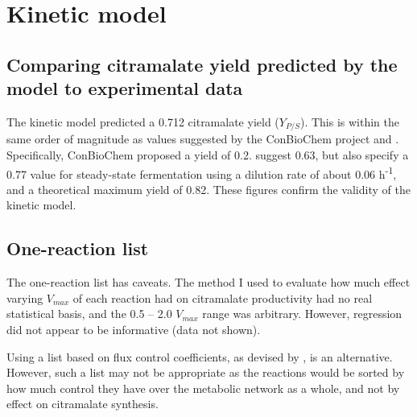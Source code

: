 \documentclass[parskip=full, numbers=noenddot]{scrreprt}
\begin{document}

\section{Kinetic model}
\label{sec:discussion-kinetic}


\subsection{Comparing citramalate yield predicted by the model to experimental data}
\label{ssec:discussion-kinetic-experimental}

The kinetic model predicted a 0.712 citramalate yield ($Y_{P/S}$). This is within the same order of magnitude as values suggested by the ConBioChem project and \citet{wu_production_2016}. Specifically, ConBioChem proposed a yield of 0.2. \citet{wu_production_2016} suggest 0.63, but also specify a 0.77 value for steady-state fermentation using a dilution rate of about 0.06 h\textsuperscript{-1}, and a theoretical maximum yield of 0.82. These figures confirm the validity of the kinetic model.

\subsection{One-reaction list}
\label{ssec:discussion-kinetic-onereaction}

The one-reaction list has caveats. The method I used to evaluate how much effect varying $V_{max}$ of each reaction had on citramalate productivity had no real statistical basis, and the 0.5 -- 2.0 $V_{max}$ range was arbitrary. However, regression did not appear to be informative (data not shown).

Using a list based on flux control coefficients, as devised by \citet{millard_metabolic_2017}, is an alternative. However, such a list may not be appropriate as the reactions would be sorted by how much control they have over the metabolic network as a whole, and not by effect on citramalate synthesis.
\end{document}
